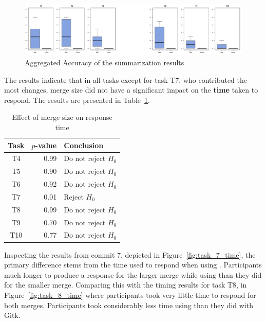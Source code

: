 \begin{figure}[htpb]
  \centering
  \includegraphics[width=0.9\linewidth]{Figures/evaluation/accuracy.pdf}
  \caption{Aggregated Accuracy of the summarization results}
  \label{fig:agg_accuracy}
\end{figure}

The results indicate that in all tasks except for task T7, who
contributed the most changes, merge size did not have a significant
impact on the \textbf{time} taken to respond. The results are presented
in Table~\ref{tab:cross_commit_timing}.

\begin{table}[htpb]
  \centering
  \caption{Effect of merge size on response time}
  \label{tab:cross_commit_timing}
  \begin{tabular}{crl}
    \toprule
    Task & $p$-value & Conclusion\\\midrule
    T4   & 0.99      & Do not reject $H_0$\\
    T5   & 0.90      & Do not reject $H_0$\\
    T6   & 0.92      & Do not reject $H_0$\\
    T7   & 0.01      & Reject $H_0$\\
    T8   & 0.99      & Do not reject $H_0$\\
    T9   & 0.70      & Do not reject $H_0$\\
    T10  & 0.77      & Do not reject $H_0$\\
    \bottomrule
  \end{tabular}
\end{table}

Inspecting the results from commit 7, depicted in
Figure~\ref{fig:task_7_time}, the primary difference stems from the time
used to respond when using \tool{}. Participants much longer to produce
a response for the larger merge while using \tool{} than they did for
the smaller merge. Comparing this with the timing results for task T8,
in Figure~\ref{fig:task_8_time} where participants took very little time
to respond for both merges. Participants took considerably less time
using \tool{} than they did with Gitk.

